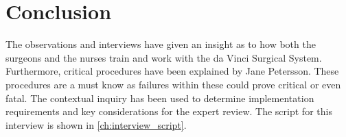 \section*{Conclusion}
The observations and interviews have given an insight as to how both the surgeons and the nurses train and work with the da Vinci Surgical System. Furthermore, critical procedures have been explained by Jane Petersson. These procedures are a must know as failures within these could prove critical or even fatal. The contextual inquiry has been used to determine implementation requirements and key considerations for the expert review. The script for this interview is shown in \autoref{ch:interview_script}.


\appendix
%
